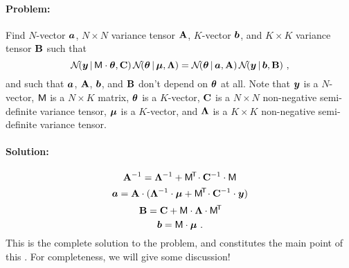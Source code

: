 \paragraph{Problem:}
Find $N$-vector $\boldsymbol{a}$, $N\times N$ variance tensor $\mathbf{A}$, $K$-vector $\boldsymbol{b}$,
and $K\times K$ variance tensor $\mathbf{B}$ such that
\begin{equation}\label{eq:problem}
\mathcal{N}\!(\boldsymbol{y}\,|\,\mathsf{M}\cdot\boldsymbol{\theta},\mathbf{C})\,\mathcal{N}\!(\boldsymbol{\theta}\,|\,\boldsymbol{\mu},\mathbf{\Lambda})
 = \mathcal{N}\!(\boldsymbol{\theta}\,|\,\boldsymbol{a},\mathbf{A})\,\mathcal{N}\!(\boldsymbol{y}\,|\,\boldsymbol{b},\mathbf{B}) ~ ,
\end{equation}
and such that $\boldsymbol{a}$, $\mathbf{A}$, $\boldsymbol{b}$, and $\mathbf{B}$ don't depend on $\boldsymbol{\theta}$ at all.
Note that
$\boldsymbol{y}$ is a $N$-vector,
$\mathsf{M}$ is a $N\times K$ matrix,
$\boldsymbol{\theta}$ is a $K$-vector,
$\mathbf{C}$ is a $N\times N$ non-negative semi-definite variance tensor,
$\boldsymbol{\mu}$ is a $K$-vector,
and
$\mathbf{\Lambda}$ is a $K\times K$ non-negative semi-definite variance tensor.

\paragraph{Solution:}
\begin{equation}
\mathbf{A}^{-1} = \mathbf{\Lambda}^{-1} + \mathsf{M}^{\!\mathsf{T}\!} \cdot \mathbf{C}^{-1} \cdot \mathsf{M}
\end{equation}
\begin{equation}
\boldsymbol{a} = \mathbf{A} \cdot (\mathbf{\Lambda}^{-1} \cdot \boldsymbol{\mu} + \mathsf{M}^{\!\mathsf{T}\!} \cdot \mathbf{C}^{-1} \cdot \boldsymbol{y})
\end{equation}
\begin{equation}
\mathbf{B} = \mathbf{C} + \mathsf{M} \cdot \mathbf{\Lambda} \cdot \mathsf{M}^{\!\mathsf{T}\!}
\end{equation}
\begin{equation}
\boldsymbol{b} = \mathsf{M} \cdot \boldsymbol{\mu}
~ .
\end{equation}
This is the complete solution to the problem, and constitutes the main point
of this \documentname.
For completeness, we will give some discussion!

